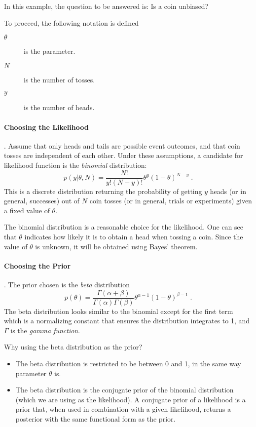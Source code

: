 \begin{example}
    In this example, the question to be answered is: Is a coin unbiased? 

    To proceed, the following notation is defined
    \begin{description}
        \item[$\theta$] is the parameter.
        \item[$N$] is the number of tosses.
        \item[$y$] is the number of heads. 
    \end{description}

    \paragraph{Choosing the Likelihood}. Assume that only heads and tails are possible event outcomes, and that coin tosses are independent of each other. Under these assumptions, a candidate for likelihood function is the \emph{binomial} distribution:
    \begin{equation}
        p(y|\theta, N)=\dfrac{N!}{y!(N-y)!}\theta^y(1-\theta)^{N-y}\;.
    \end{equation}
    This is a discrete distribution returning the probability of getting $y$ heads 
    (or in general, successes) out of $N$ coin tosses (or in general, trials or experiments) 
    given a fixed value of $\theta$.

    The binomial distribution is a reasonable choice for the likelihood. One can see that $\theta$
    indicates how likely it is to obtain a head when tossing a coin. Since the value of $\theta$ is
    unknown, it will be obtained using Bayes' theorem.

    \paragraph{Choosing the Prior}. The prior chosen is the \emph{beta} distribution
    \begin{equation}
        p(\theta)=\dfrac{\Gamma(\alpha+\beta)}{\Gamma(\alpha)\Gamma(\beta)}\theta^{\alpha-1}(1-\theta)^{\beta-1}\;.
    \end{equation}
    The beta distribution looks similar to the binomial except for the first term which is a normalizing constant that ensures the distribution integrates to 1, and $\Gamma$ is the \emph{gamma function}.

    Why using the beta distribution as the prior? 
    \begin{itemize}
        \item The beta distribution is restricted to be between 0 and 1, in the same way parameter $\theta$ is. 
        \item The beta distribution is the conjugate prior of the binomial distribution (which we are using as the likelihood). A conjugate prior of a likelihood is a prior that, when used in combination with a given likelihood, returns a posterior with the same functional form as the prior.
    \end{itemize}
    

\end{example}
